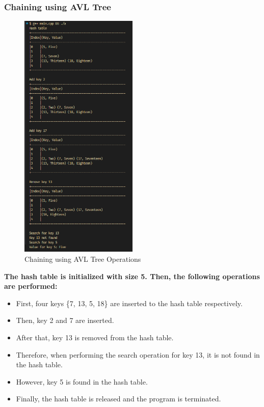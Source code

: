 \subsubsection*{Chaining using AVL Tree}
\begin{figure}[H]
	\centering
	\includegraphics[width=0.5\textwidth, height=0.65\textheight]{images/chaining_avl/main.png}
	\caption{Chaining using AVL Tree Operations}
\end{figure}
\textbf{The hash table is initialized with size 5. Then, the following operations are performed:}
\begin{itemize}
	\item First, four keys \{7, 13, 5, 18\} are inserted to the hash table respectively.
	\item Then, key 2 and 7 are inserted.
	\item After that, key 13 is removed from the hash table.
	\item Therefore, when performing the search operation for key 13, it is not found in the hash table.
	\item However, key 5 is found in the hash table.
	\item Finally, the hash table is released and the program is terminated.
\end{itemize}

